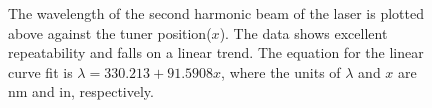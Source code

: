 \begin{figure}

\centering



\caption[Results of the laser calibration experiment]{The wavelength of the second harmonic beam of the laser is plotted above against the tuner position(\(x\)). The data shows excellent repeatability and falls on a linear trend. The equation for the linear curve fit is \(\lambda = 330.213 + 91.5908x\), where the units of \(\lambda\) and \(x\) are nm and in, respectively.}

\label{fig:laserCalibrationResults}

\end{figure}

